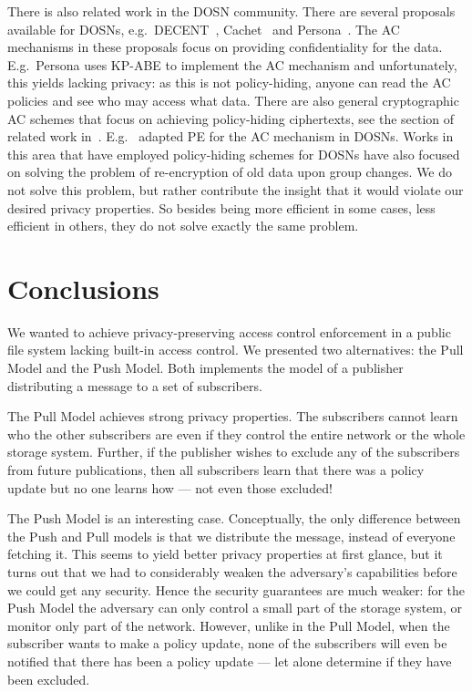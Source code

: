 There is also related work in the \ac{DOSN} community.
There are several proposals available for \acp{DOSN}, e.g.\ 
DECENT~\cite{DECENT}, Cachet~\cite{Cachet} and Persona~\cite{Persona}.
The \ac{AC} mechanisms in these proposals focus on providing confidentiality 
for the data.
E.g.\ Persona uses \ac{KP-ABE} to implement the \ac{AC} mechanism and
unfortunately, this yields lacking privacy: as this is not policy-hiding, 
anyone can read the \ac{AC} policies and see who may access what data.
There are also general cryptographic \ac{AC} schemes that focus on achieving 
policy-hiding ciphertexts, see the section of related work 
in~\cite{TowardsPPACwHPHCHD}.
E.g.\ \citet{PEAC} adapted \ac{PE} for the \ac{AC} mechanism in \acp{DOSN}.
Works in this area that have employed policy-hiding schemes for \acp{DOSN} have
also focused on solving the problem of re-encryption of old data upon group 
changes.
We do not solve this problem, but rather contribute the insight that it would 
violate our desired privacy properties.
So besides being more efficient in some cases, less efficient in others, they 
do not solve exactly the same problem.



\section{Conclusions}\label{Conclusions}

We wanted to achieve privacy-preserving access control enforcement in a public 
file system lacking built-in access control.
We presented two alternatives: the Pull Model and the Push Model.
Both implements the model of a publisher distributing a message to a set of 
subscribers.

The Pull Model achieves strong privacy properties.
The subscribers cannot learn who the other subscribers are even if they control 
the entire network or the whole storage system.
Further, if the publisher wishes to exclude any of the subscribers from future 
publications, then all subscribers learn that there was a policy update but no 
one learns how --- not even those excluded!

The Push Model is an interesting case.
Conceptually, the only difference between the Push and Pull models is that we 
distribute the message, instead of everyone fetching it.
This seems to yield better privacy properties at first glance, but it turns out
that we had to considerably weaken the adversary's capabilities before we could
get any security.
Hence the security guarantees are much weaker: for the Push Model the adversary 
can only control a small part of the storage system, or monitor only part of 
the network.
However, unlike in the Pull Model, when the subscriber wants to make a policy 
update, none of the subscribers will even be notified that there has been 
a policy update --- let alone determine if they have been excluded.

